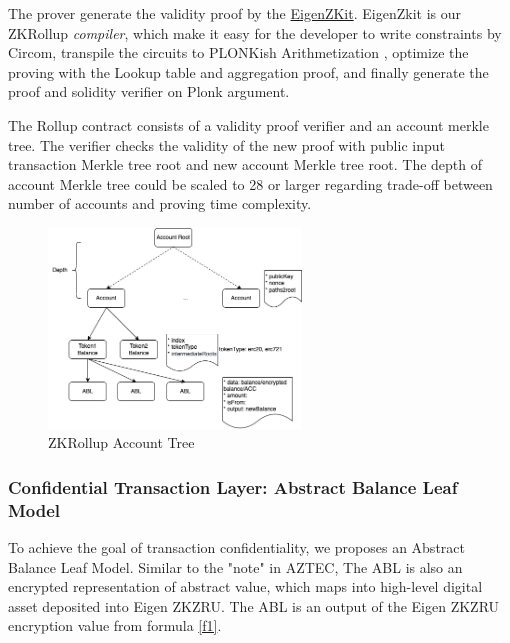 \documentclass{article}
\begin{document}

The prover generate the validity proof by the \href{https://github.com/ieigen/EigenZKit}{EigenZKit}. EigenZkit is our ZKRollup \textit{compiler}, which make it easy for the developer to write constraints by Circom, transpile the circuits to PLONKish Arithmetization \cite{gabizon2019plonk}, optimize the proving with the Lookup table and aggregation proof, and finally generate the proof and solidity verifier on Plonk argument. 

The Rollup contract consists of a validity proof verifier and an account merkle tree. The verifier checks the validity of the new proof with public input transaction Merkle tree root and new account Merkle tree root. The depth of account Merkle tree could be scaled to 28 or larger regarding trade-off between number of accounts and proving time complexity.  

\begin{figure}
    \centering
    \includegraphics[width=0.6\textwidth]{zkzru.drawio.png}
    \caption{\label{fig:zkzru}ZKRollup Account Tree}
\end{figure}

\subsubsection{Confidential Transaction Layer: Abstract Balance Leaf Model}
To achieve the goal of transaction confidentiality, we proposes an Abstract Balance Leaf Model. Similar to the "note" in AZTEC, The ABL is also an encrypted representation of abstract value, which maps into high-level digital asset deposited into Eigen ZKZRU. The ABL is an output of the Eigen ZKZRU encryption value from formula \ref{f1}. 
\end{document}
